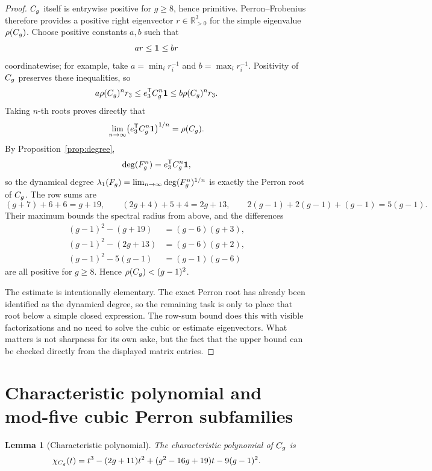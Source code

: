 \documentclass[11pt]{article}
\newtheorem{lemma}[theorem]{Lemma}
\theoremstyle{remark}
\numberwithin{equation}{section}
\begin{document}
\begin{proof}
\(C_g\) itself is entrywise positive for \(g\geq 8\), hence primitive.
Perron--Frobenius therefore provides a positive right eigenvector
\(r\in\mathbb R_{>0}^3\) for the simple eigenvalue \(\rho(C_g)\).  Choose
positive constants \(a,b\) such that
\[
a r\leq\mathbf{1}\leq b r
\]
coordinatewise; for example, take
\(a=\min_i r_i^{-1}\) and \(b=\max_i r_i^{-1}\).  Positivity of \(C_g\)
preserves these inequalities, so
\[
a\rho(C_g)^n r_3
\leq e_3^{\mathsf T}C_g^n\mathbf{1}
\leq b\rho(C_g)^n r_3.
\]
Taking \(n\)-th roots proves directly that
\[
\lim_{n\to\infty}
\bigl(e_3^{\mathsf T}C_g^n\mathbf{1}\bigr)^{1/n}=\rho(C_g).
\]
By Proposition~\ref{prop:degree},
\[
\operatorname{deg}(F_g^n)=e_3^{\mathsf T}C_g^n\mathbf{1},
\]
so the dynamical degree
\(\lambda_1(F_g)=\lim_{n\to\infty}\operatorname{deg}(F_g^n)^{1/n}\) is exactly the Perron
root of \(C_g\).  The row sums are
\[
(g+7)+6+6=g+19,\qquad (2g+4)+5+4=2g+13,\qquad 2(g-1)+2(g-1)+(g-1)=5(g-1).
\]
Their maximum bounds the spectral radius from above, and the differences
\begin{align*}
(g-1)^2-(g+19)&=(g-6)(g+3),\\
(g-1)^2-(2g+13)&=(g-6)(g+2),\\
(g-1)^2-5(g-1)&=(g-1)(g-6)
\end{align*}
are all positive for \(g\geq 8\).  Hence \(\rho(C_g)<(g-1)^2\).
\par
The estimate is intentionally elementary.  The exact Perron root has already
been identified as the dynamical degree, so the remaining task is only to place
that root below a simple closed expression.  The row-sum bound does this with
visible factorizations and no need to solve the cubic or estimate eigenvectors.
What matters is not sharpness for its own sake, but the fact that the upper
bound can be checked directly from the displayed matrix entries.
\end{proof}

\section{Characteristic polynomial and mod-five cubic Perron subfamilies}\label{sec:cubic}

\begin{lemma}[Characteristic polynomial]\label{lem:charpoly}
The characteristic polynomial of \(C_g\) is
\[
\chi_{C_g}(t)=t^3-(2g+11)t^2+(g^2-16g+19)t-9(g-1)^2.
\]
\end{lemma}
\end{document}
